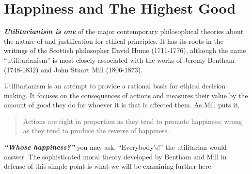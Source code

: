\documentclass[
  12pt, openany]{book}
\theoremstyle{definition}
\theoremstyle{definition}
\theoremstyle{definition}
\theoremstyle{remark}
\begin{document}
\hypertarget{happiness-and-the-highest-good}{%
\section{Happiness and The Highest Good}\label{happiness-and-the-highest-good}}

\textbf{\emph{Utilitarianism is one}} of the major contemporary philosophical theories about the nature of and justification for ethical principles. It has its roots in the writings of the Scottish philosopher David Hume (1711-1776), although the name ``utilitarianism'' is most closely associated with the works of Jeremy Bentham (1748-1832) and John Stuart Mill (1806-1873).

Utilitarianism is an attempt to provide a rational basis for ethical decision making. It focuses on the consequences of actions and measures their value by the amount of good they do for whoever it is that is affected them. As Mill puts it,

\begin{quote}
Actions are right in proportion as they tend to promote happiness; wrong as they tend to produce the reverse of happiness.
\end{quote}

\textbf{\emph{``Whose happiness?''}} you may ask. ``Everybody's!'' the utilitarian would answer. The sophisticated moral theory developed by Bentham and Mill in defense of this simple point is what we will be examining further here.
\end{document}
